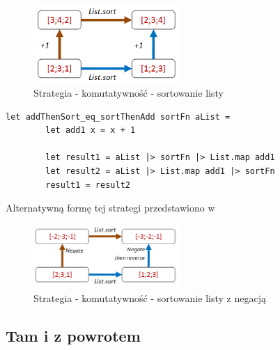 \begin{figure}
    \centering
    \includegraphics[width=0.5\textwidth]{images/property_list_sort1.png}
    \caption{Strategia - komutatywność - sortowanie listy}
    \label{fig:commutative_strategy_list_sort}
\end{figure}
\lstset{language=FSharp, basicstyle=\scriptsize}
\begin{lstlisting}[frame=single,caption={Test sortowania listy z wykorzystaniem strategii komutatywnej},label=kod:list_sort_add1]
    let addThenSort_eq_sortThenAdd sortFn aList =
        let add1 x = x + 1

        let result1 = aList |> sortFn |> List.map add1
        let result2 = aList |> List.map add1 |> sortFn
        result1 = result2
\end{lstlisting}
Alternatywną formę tej strategi przedstawiono w 
\begin{figure}
    \centering
    \includegraphics[width=0.5\textwidth]{images/property_list_sort3.png}
    \caption{Strategia - komutatywność - sortowanie listy z negacją}
    \label{fig:commutative_strategy_list_sort_with_negation}
\end{figure}

\subsection{Tam i z powrotem}

